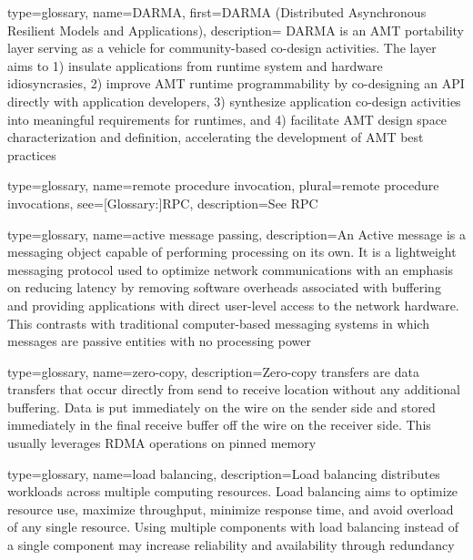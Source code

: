 {
  type=glossary,
  name={DARMA},
  first={DARMA (Distributed Asynchronous Resilient Models and Applications)},
  description={ DARMA is an AMT portability layer serving as a vehicle for
    community-based co-design activities.  The layer aims to 1) insulate applications from runtime system and hardware idiosyncrasies,
2) improve AMT runtime programmability by co-designing an API directly with
  application developers, 3) synthesize application co-design activities into
  meaningful requirements for runtimes, and 4) 
facilitate AMT design space characterization and definition, accelerating the development of AMT best practices}
}

{
  type=glossary,
  name={remote procedure invocation},
  plural={remote procedure invocations},
  see={[Glossary:]{RPC}},
  description={See RPC}
}

{
  type=glossary,
  name={active message passing},
  description={An Active message is a messaging object
  capable of performing processing on its own. It is a lightweight
  messaging protocol used to optimize network communications with an
  emphasis on reducing latency by removing software overheads
  associated with buffering and providing applications with direct
  user-level access to the network hardware. This contrasts with
  traditional computer-based messaging systems in which messages are
  passive entities with no processing power}
}

{
  type={glossary},
  name={zero-copy},
  description={Zero-copy transfers are data transfers that occur directly from send to receive location without any additional buffering. Data is put immediately on the wire on the sender side and stored immediately in the final receive buffer off the wire on the receiver side. This usually leverages \gls{RDMA} operations on pinned memory}
}

{
  type={glossary},
  name={load balancing},
  description={Load balancing distributes workloads across multiple
  computing resources. Load balancing aims to optimize resource use,
  maximize throughput, minimize response time, and avoid overload of
  any single resource. Using multiple components with load balancing
  instead of a single component may increase reliability and
  availability through redundancy}  
}

